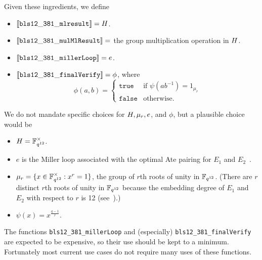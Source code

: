 \noindent Given these ingredients, we define
\begin{itemize}
\item $\llbracket\mathit{\mathtt{bls12\_381\_mlresult}}\rrbracket = H$.
\item $\llbracket\mathit{\mathtt{bls12\_381\_mulMlResult}}\rrbracket =$
the group multiplication operation in $H$.
\item $\llbracket\mathit{\mathtt{bls12\_381\_millerLoop}}\rrbracket = e$.
\item $\llbracket\mathit{\mathtt{bls12\_381\_finalVerify}}\rrbracket = \phi$,
where
$$
\phi(a,b) = \begin{cases}
               \mathtt{true} & \text{if $\psi(ab^{-1}) = 1_{\mu_r}$} \\
               \mathtt{false} & \text{otherwise.}
            \end{cases}
$$
\end{itemize}

\medskip
\noindent
We do not mandate specific choices for $H, \mu_r, e$, and $\phi$, but a
plausible choice would be
\begin{itemize}
\item $H = \mathbb{F}_{q^{12}}^{\times}$.
\item $e$ is the Miller loop associated with the optimal Ate pairing
for $E_1$ and $E_2$~\cite{Vercauteren}.
\item $\mu_r = \{x \in \mathbb{F}_{q^{12}}^{\times}: x^r=1\}$, the group of $r$th roots of unity in $\mathbb{F}_{q^{12}}$.
(There are $r$ distinct $r$th roots of unity in $\mathbb{F}_{q^{12}}$ because the embedding
degree of $E_1$ and $E_2$ with respect to $r$ is 12 (see~\cite[4.1]{Costello-pairings}).)
\item $\psi(x) = x^{\frac{q-1}{r}}$.
\end{itemize}

\noindent The functions \texttt{bls12\_381\_millerLoop} and (especially)
\texttt{bls12\_381\_finalVerify} are expected
to be expensive, so their use should be kept to a minimum.  Fortunately most
current use cases do not require many uses of these functions.
